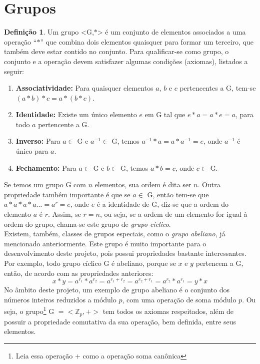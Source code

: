 \documentclass[14pt, oneside]{book}
\newcommand{\Z}{\mathbb{Z}}
\newcommand\tab[1][1cm]{\hspace*{#1}}
\theoremstyle{definition}
\newtheorem{defn}{Definição}
\begin{document}
            \section{Grupos}
                \begin{defn}Um grupo <G,$\ast$> é um conjunto de elementos associados a uma operação ``$\ast$'' que combina dois elementos quaisquer para formar um terceiro, que também deve estar contido no conjunto. Para qualificar-se como grupo, o conjunto e a operação devem satisfazer algumas condições (axiomas), listados a seguir:
                
                \begin{enumerate}
                    \item \textbf{Associatividade:} Para quaisquer elementos $a$, $b$ e $c$ pertencentes a G, tem-se $(a\ast b)\ast c = a\ast (b\ast c)$.
                    \item \textbf{Identidade:} Existe um único elemento $e$ em G tal que $e\ast a = a\ast e=a$, para todo $a$ pertencente a G.
                    \item \textbf{Inverso:} Para $a\in $ G e $a^{-1}\in $ G, temos $a^{-1}\ast a = a\ast a^{-1}=e$, onde $a^{-1}$ é único para $a$.
                    \item \textbf{Fechamento:} Para $a\in $ G e $b\in $ G, temos $a\ast b = c$, onde $c\in $ G.
                \end{enumerate}
                \end{defn}
                \tab Se temos um grupo G com $n$ elementos, sua ordem é dita ser $n$. Outra propriedade também importante é que se $a\in $ G, então tem-se que $a\ast a\ast a\ast a ... =a^r=e$, onde $e$ é a identidade de G, diz-se que a ordem do elemento $a$ é $r$. Assim, se  $r = n$, ou seja, se a ordem de um elemento for igual à ordem do grupo, chama-se este grupo de \textit{grupo cíclico}.\\
                \tab Existem, também, classes de grupos especiais, como o \textit{grupo abeliano}, já mencionado anteriormente. Este grupo é muito importante para o desenvolvimento deste projeto, pois possui propriedades bastante interessantes. 
                Por exemplo, todo grupo cíclico G é abeliano, porque se $x$ e $y$ pertencem a G, então, de acordo com as propriedades anteriores: 
                \begin{equation}
                    x\ast y =a^{r_1}\ast a^{r_2} = a^{r_1+r_2} = a^{r_2+r_1}=a^{r_2}\ast a^{r_1}=y\ast x 
                \end{equation}
                \tab No âmbito deste projeto, um exemplo de grupo abeliano é o conjunto dos números inteiros reduzidos a módulo $p$, com uma operação de soma módulo $p$. Ou seja, o grupo\footnote{Leia essa operação $+$ como a operação soma canônica} G $ = <\Z_p,+>$ tem todos os axiomas respeitados, além de possuir a propriedade comutativa da sua operação, bem definida, entre seus elementos.
                
\end{document}
